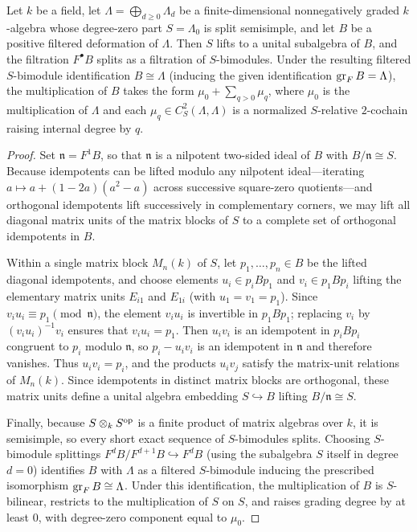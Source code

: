 \begin{lemma}
\label{lem:split-positive-deformation}
Let $k$ be a field, let $\Lambda=\bigoplus_{d\geq0}\Lambda_d$ be a
finite-dimensional nonnegatively graded $k$-algebra whose degree-zero part
$S=\Lambda_0$ is split semisimple, and let $B$ be a positive filtered
deformation of $\Lambda$. Then $S$ lifts to a unital subalgebra of $B$, and
the filtration $F^\bullet B$ splits as a filtration of $S$-bimodules. Under
the resulting filtered $S$-bimodule identification $B\cong\Lambda$ (inducing
the given identification $\operatorname{gr}_F B=\Lambda$), the multiplication of $B$ takes
the form $\mu_0+\sum_{q>0}\mu_q$, where $\mu_0$ is the multiplication of
$\Lambda$ and each $\mu_q\in C^2_S(\Lambda,\Lambda)$ is a normalized
$S$-relative $2$-cochain raising internal degree by $q$.
\end{lemma}
\begin{proof}
Set $\mathfrak n=F^1 B$, so that $\mathfrak n$ is a nilpotent two-sided
ideal of $B$ with $B/\mathfrak n\cong S$. Because idempotents can be lifted
modulo any nilpotent ideal—iterating $a\mapsto a+(1-2a)(a^2-a)$ across
successive square-zero quotients—and orthogonal idempotents lift
successively in complementary corners, we may lift all diagonal matrix units
of the matrix blocks of $S$ to a complete set of orthogonal idempotents in
$B$.

Within a single matrix block $M_n(k)$ of $S$, let $p_1,\ldots,p_n\in B$ be
the lifted diagonal idempotents, and choose elements $u_i\in p_i B p_1$ and
$v_i\in p_1 B p_i$ lifting the elementary matrix units $E_{i1}$ and $E_{1i}$
(with $u_1=v_1=p_1$). Since $v_i u_i\equiv p_1\pmod{\mathfrak n}$, the
element $v_i u_i$ is invertible in $p_1 B p_1$; replacing $v_i$ by
$(v_i u_i)^{-1}v_i$ ensures that $v_i u_i=p_1$. Then $u_i v_i$ is an
idempotent in $p_i B p_i$ congruent to $p_i$ modulo $\mathfrak n$, so
$p_i-u_i v_i$ is an idempotent in $\mathfrak n$ and therefore vanishes. Thus
$u_i v_i=p_i$, and the products $u_i v_j$ satisfy the matrix-unit relations
of $M_n(k)$. Since idempotents in distinct matrix blocks are orthogonal,
these matrix units define a unital algebra embedding $S\hookrightarrow B$
lifting $B/\mathfrak n\cong S$.

Finally, because $S\otimes_k S^{\mathrm{op}}$ is a finite product of matrix algebras
over $k$, it is semisimple, so every short exact sequence of $S$-bimodules
splits. Choosing $S$-bimodule splittings $F^d B/F^{d+1}B\hookrightarrow F^d B$
(using the subalgebra $S$ itself in degree $d=0$) identifies $B$ with
$\Lambda$ as a filtered $S$-bimodule inducing the prescribed isomorphism
$\operatorname{gr}_F B\cong\Lambda$. Under this identification, the multiplication of $B$
is $S$-bilinear, restricts to the multiplication of $S$ on $S$, and raises
grading degree by at least $0$, with degree-zero component equal to $\mu_0$.
\end{proof}

